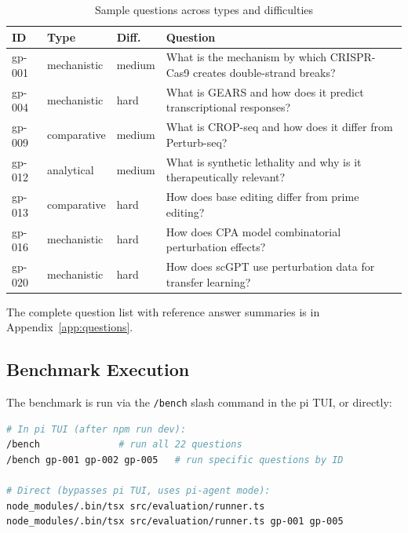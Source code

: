 \documentclass[12pt, a4paper]{article}
\begin{document}
\begin{table}[ht]
\centering
\caption{Sample questions across types and difficulties}
\begin{tabularx}{\textwidth}{lllX}
\toprule
\textbf{ID} & \textbf{Type} & \textbf{Diff.} & \textbf{Question} \\
\midrule
gp-001 & mechanistic & medium & What is the mechanism by which CRISPR-Cas9 creates double-strand breaks? \\
gp-004 & mechanistic & hard   & What is GEARS and how does it predict transcriptional responses? \\
gp-009 & comparative & medium & What is CROP-seq and how does it differ from Perturb-seq? \\
gp-012 & analytical  & medium & What is synthetic lethality and why is it therapeutically relevant? \\
gp-013 & comparative & hard   & How does base editing differ from prime editing? \\
gp-016 & mechanistic & hard   & How does CPA model combinatorial perturbation effects? \\
gp-020 & mechanistic & hard   & How does scGPT use perturbation data for transfer learning? \\
\bottomrule
\end{tabularx}
\end{table}

\noindent The complete question list with reference answer summaries is in Appendix~\ref{app:questions}.


\subsection{Benchmark Execution}

The benchmark is run via the \texttt{/bench} slash command in the pi TUI, or directly:

\begin{lstlisting}[language=bash, caption={Running the benchmark}]
# In pi TUI (after npm run dev):
/bench              # run all 22 questions
/bench gp-001 gp-002 gp-005   # run specific questions by ID

# Direct (bypasses pi TUI, uses pi-agent mode):
node_modules/.bin/tsx src/evaluation/runner.ts
node_modules/.bin/tsx src/evaluation/runner.ts gp-001 gp-005
\end{lstlisting}
\end{document}

